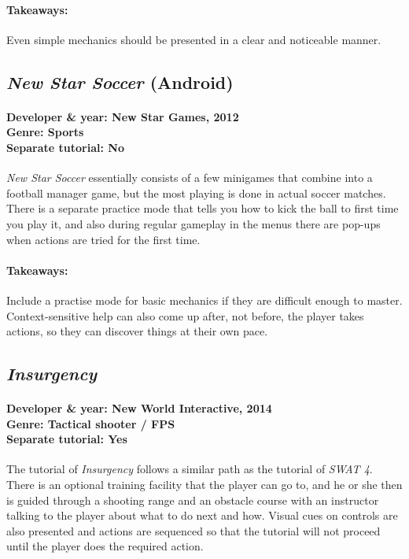 \paragraph{Takeaways:}
Even simple mechanics should be presented in a clear and noticeable manner.

\subsection{\textit{New Star Soccer } (Android)}
\paragraph{Developer \& year: New Star Games, 2012 \\ Genre: Sports \\ Separate tutorial: No \\}
\textit{New Star Soccer} essentially consists of a few minigames that combine into a football manager game, but the most playing is done in actual soccer matches. There is a separate practice mode that tells you how to kick the ball to first time you play it, and also during regular gameplay in the menus there are pop-ups when actions are tried for the first time.
\paragraph{Takeaways:}
Include a practise mode for basic mechanics if they are difficult enough to master.
Context-sensitive help can also come up after, not before, the player takes actions, so they can discover things at their own pace.

\subsection{\textit{Insurgency}}
\paragraph{Developer \& year: New World Interactive, 2014 \\ Genre: Tactical shooter / FPS \\ Separate tutorial: Yes \\}
The tutorial of \textit{Insurgency} follows a similar path as the tutorial of \textit{SWAT 4}. There is an optional training facility that the player can go to, and he or she then is guided through a shooting range and an obstacle course with an instructor talking to the player about what to do next and how. Visual cues on controls are also presented and actions are sequenced so that the tutorial will not proceed until the player does the required action. 
